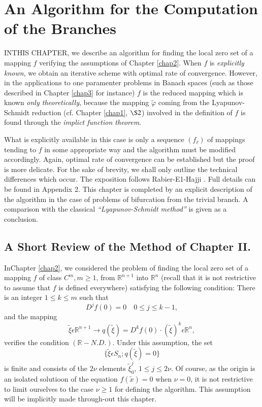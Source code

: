 
\chapter{An Algorithm for the Computation of the
  Branches}\label{chap4}

IN\pageoriginale THIS CHAPTER, we describe an algorithm for finding
the local zero set of a mapping $f$ verifying the assumptions of Chapter
\ref{chap2}. When $f$ is {\em explicitly known}, we obtain an iterative
scheme with optimal rate of convergence. However, in the applications
to one paramenter problems in Banach spaces (such as those described
in Chapter \ref{chap3} for instance) $f$ is the reduced mapping which is
known {\em only theoretically}, because the mapping
$\widetilde{\varphi}$ coming from the Lyapunov-Schmidt reduction
(cf. Chapter \ref{chap1}, $\S 2$) involved in the definition of $f$ is
found through the {\em implict function theorem}.

What is explicitly available in this case is only a sequence
$(f_{\ell})$ of mappings tending to $f$ in some appropriate way and the
algorithm must be modified accordingly. Again, optimal rate of
convergence can be established but the proof is more delicate. For the
sake of brevity, we shall only outline the technical differences which
occur. The exposition follows Rabier-E1-Hajji \cite{33}. Full details can
be found in Appendix 2. This chapter is completed by an explicit
description of the algorithm in the case of problems of bifurcation
from the trivial branch. A comparison with the classical {\em
  ``Lyapunov-Schmidt method''} is given as a conclusion.

\section{A Short Review of the Method of Chapter
  II.}\label{chap4-sec1}

In\pageoriginale Chapter \ref{chap2}, we considered the problem of
finding the local zero set of a mapping $f$ of class $C^{m}, m \geq 1$,
from $\mathbb{R}^{n+1}$ into $\mathbb{R}^{n}$ (recall that it is not
restrictive to assume that $f$ is defined everywhere) satisfying the
following condition: There is an integer $1 \leq k \leq m$ such that
$$
D^{j}f(0) = 0 \quad 0 \leq j \leq k-1,
$$
and the mapping
$$
\widetilde{\xi} \epsilon \mathbb{R}^{n+1} \to q(\widetilde{\xi}) =
D^{k}f(0) \cdot (\widetilde{\xi})^{k} \epsilon \mathbb{R}^{n},
$$
verifies the condition $(\mathbb{R}-N.D.)$. Under this assumption, the
set 
$$
\{\widetilde{\xi} \epsilon S_{n} ; q(\widetilde{\xi}) = 0\}
$$
is finite and consists of the $2 \nu$ elements
$\widetilde{\xi}_{0}^{j}$, $1 \leq j \leq 2\nu$. Of course, as the
origin is an isolated solutioon of the equation $f(\widetilde{x}) = 0$
when $\nu = 0$, it is not restrictive to limit ourselves to the case
$\nu \geq 1$ for defining the algorithm. This assumption will be
implicitly made through-out this chapter.

